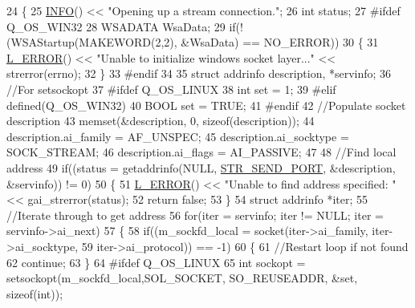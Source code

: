 \begin{DoxyCode}
24 \{
25     \hyperlink{Log_8h_a7cec51f4ce4b22e8c0f256485d57fca7}{INFO}() << \textcolor{stringliteral}{"Opening up a stream connection."};
26     \textcolor{keywordtype}{int} status;
27 \textcolor{preprocessor}{#ifdef Q\_OS\_WIN32}
28 \textcolor{preprocessor}{}    WSADATA WsaData;
29     \textcolor{keywordflow}{if}(!(WSAStartup(MAKEWORD(2,2), &WsaData) == NO\_ERROR))
30     \{
31         \hyperlink{Log_8h_a1a242c34c5066fb0c62d909f22d3716d}{L\_ERROR}() << \textcolor{stringliteral}{"Unable to initialize windows socket layer..."} << strerror(errno);
32     \}
33 \textcolor{preprocessor}{#endif}
34 \textcolor{preprocessor}{}
35     \textcolor{keyword}{struct }addrinfo description, *servinfo;
36     \textcolor{comment}{//For setsockopt}
37 \textcolor{preprocessor}{#ifdef Q\_OS\_LINUX}
38 \textcolor{preprocessor}{}    \textcolor{keywordtype}{int} set = 1;
39 \textcolor{preprocessor}{#elif defined(Q\_OS\_WIN32)}
40 \textcolor{preprocessor}{}    BOOL set = TRUE;
41 \textcolor{preprocessor}{#endif}
42 \textcolor{preprocessor}{}    \textcolor{comment}{//Populate socket description}
43     memset(&description, 0, \textcolor{keyword}{sizeof}(description));
44     description.ai\_family = AF\_UNSPEC;
45     description.ai\_socktype = SOCK\_STREAM;
46     description.ai\_flags = AI\_PASSIVE;
47 
48     \textcolor{comment}{//Find local address}
49     \textcolor{keywordflow}{if}((status = getaddrinfo(NULL, \hyperlink{SocketConstants_8h_a12d15f06e320c26324ec45934324faf6}{STR\_SEND\_PORT}, &description, &servinfo)) != 0)
50     \{
51         \hyperlink{Log_8h_a1a242c34c5066fb0c62d909f22d3716d}{L\_ERROR}() << \textcolor{stringliteral}{"Unable to find address specified: "} << gai\_strerror(status);
52         \textcolor{keywordflow}{return} \textcolor{keyword}{false};
53     \}
54     \textcolor{keyword}{struct }addrinfo *iter;
55     \textcolor{comment}{//Iterate through to get address}
56     \textcolor{keywordflow}{for}(iter = servinfo; iter != NULL; iter = servinfo->ai\_next)
57     \{
58         \textcolor{keywordflow}{if}((m\_sockfd\_local = socket(iter->ai\_family, iter->ai\_socktype,
59                                     iter->ai\_protocol)) == -1)
60         \{
61             \textcolor{comment}{//Restart loop if not found}
62             \textcolor{keywordflow}{continue};
63         \}
64 \textcolor{preprocessor}{#ifdef Q\_OS\_LINUX}
65 \textcolor{preprocessor}{}        \textcolor{keywordtype}{int} sockopt = setsockopt(m\_sockfd\_local,SOL\_SOCKET, SO\_REUSEADDR, &set, \textcolor{keyword}{sizeof}(\textcolor{keywordtype}{int}));

\end{DoxyCode}

